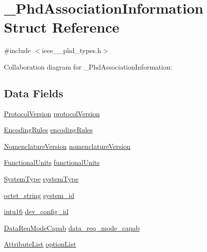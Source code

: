 \hypertarget{struct___phd_association_information}{}\section{\+\_\+\+Phd\+Association\+Information Struct Reference}
\label{struct___phd_association_information}


{\ttfamily \#include $<$ieee\+\_\+\_\+phd\+\_\+types.\+h$>$}



Collaboration diagram for \+\_\+\+Phd\+Association\+Information\+:
\subsection*{Data Fields}
\begin{DoxyCompactItemize}
\item 
\hyperlink{ieee__11073__phd__types_8h_ae08452a89d29d556e23b1310ca2d3b60}{Protocol\+Version} \hyperlink{struct___phd_association_information_a55b9aedc30d70a00073db94c28e4f74d}{protocol\+Version}
\item 
\hyperlink{ieee__11073__phd__types_8h_acbd13f96652b81e4f403f65e5f31a29c}{Encoding\+Rules} \hyperlink{struct___phd_association_information_af0dba970d01be58f42fabedee5ac40b7}{encoding\+Rules}
\item 
\hyperlink{ieee__11073__phd__types_8h_a43ee2ecad1d5896e01027af65509d7e0}{Nomenclature\+Version} \hyperlink{struct___phd_association_information_aa9fb19b774eadd5472a3065b63313b01}{nomenclature\+Version}
\item 
\hyperlink{ieee__11073__phd__types_8h_a8e706e67695c0f9873e087fb81285457}{Functional\+Units} \hyperlink{struct___phd_association_information_ab8930923eebbe6912fb19c50d52e66df}{functional\+Units}
\item 
\hyperlink{ieee__11073__phd__types_8h_a0a834b6131c015638d31327e6df10467}{System\+Type} \hyperlink{struct___phd_association_information_a5aaa528bf8358a0698d9c4f502b210d9}{system\+Type}
\item 
\hyperlink{ieee__11073__phd__types_8h_a5524261dd425fc0bd90c9d87277b7127}{octet\+\_\+string} \hyperlink{struct___phd_association_information_a2833aa79f11958342107da7209c3366b}{system\+\_\+id}
\item 
\hyperlink{ieee__11073__phd__types_8h_a3561595d2aa7416532e1c9910abd076d}{intu16} \hyperlink{struct___phd_association_information_a2f1d71c43a55a1f0a6d3bda5ea118cad}{dev\+\_\+config\+\_\+id}
\item 
\hyperlink{ieee__11073__phd__types_8h_a47c3341f719a1b0b8cd604c6faf8d84d}{Data\+Req\+Mode\+Capab} \hyperlink{struct___phd_association_information_a0641b62001055de06c0a16376b799995}{data\+\_\+req\+\_\+mode\+\_\+capab}
\item 
\hyperlink{ieee__11073__phd__types_8h_a87a34d3be532804006242c172e4beea2}{Attribute\+List} \hyperlink{struct___phd_association_information_ab77c970ef5de89f44f93429cb3e42f22}{option\+List}
\end{DoxyCompactItemize}


